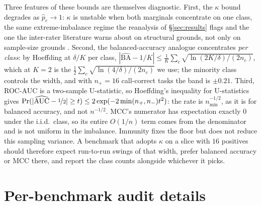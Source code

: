 \documentclass{article}
\theoremstyle{plain}
\theoremstyle{definition}
\begin{document}
Three features of these bounds are themselves diagnostic. First, the $\kappa$ bound degrades as $\hat{p}_e \to 1$: $\kappa$ is unstable when both marginals concentrate on one class, the same extreme-imbalance regime the reanalysis of \S\ref{sec:results} flags and the one the inter-rater literature warns about on structural grounds, not only on sample-size grounds \citep{feinstein1990kappa}. Second, the balanced-accuracy analogue concentrates \emph{per class}: by Hoeffding at $\delta/K$ per class, $|\widehat{\mathrm{BA}} - 1/K| \le \frac{1}{K}\sum_{c} \sqrt{\ln(2K/\delta)/(2 n_c)}$, which at $K = 2$ is the $\frac{1}{2}\sum_{c}\sqrt{\ln(4/\delta)/(2n_c)}$ we use; the minority class controls the width, and with $n_+ = 16$ call-correct tasks the band is $\pm 0.21$. Third, ROC-AUC is a two-sample U-statistic, so Hoeffding's inequality for U-statistics gives $\Pr(|\widehat{\mathrm{AUC}} - \nicefrac{1}{2}| \ge t) \le 2\exp(-2\min(n_+, n_-)t^2)$: the rate is $n_{\min}^{-1/2}$, as it is for balanced accuracy, and not $n^{-1/2}$. MCC's numerator has expectation exactly $0$ under the i.i.d.\ class, so its entire $O(1/n)$ term comes from the denominator and is not uniform in the imbalance. Immunity fixes the floor but does not reduce this sampling variance. A benchmark that adopts $\kappa$ on a slice with $16$ positives should therefore expect run-to-run swings of that width, prefer balanced accuracy or MCC there, and report the class counts alongside whichever it picks.

\section{Per-benchmark audit details}
\label{app:benchmarks}
\end{document}
